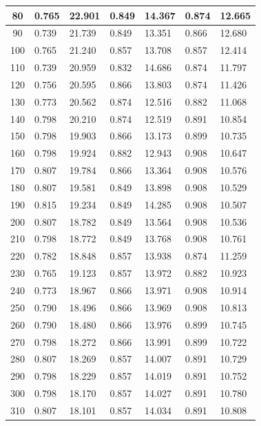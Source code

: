\begin{longtable}{|c|l|l|l|l|l|l|}
        80 & 0.765 & 22.901 & 0.849 & 14.367 & 0.874 & 12.665 \\ \hline
        90 & 0.739 & 21.739 & 0.849 & 13.351 & 0.866 & 12.680 \\ \hline
        100 & 0.765 & 21.240 & 0.857 & 13.708 & 0.857 & 12.414 \\ \hline
        110 & 0.739 & 20.959 & 0.832 & 14.686 & 0.874 & 11.797 \\ \hline
        120 & 0.756 & 20.595 & 0.866 & 13.803 & 0.874 & 11.426 \\ \hline
        130 & 0.773 & 20.562 & 0.874 & 12.516 & 0.882 & 11.068 \\ \hline
        140 & 0.798 & 20.210 & 0.874 & 12.519 & 0.891 & 10.854 \\ \hline
        150 & 0.798 & 19.903 & 0.866 & 13.173 & 0.899 & 10.735 \\ \hline
        160 & 0.798 & 19.924 & 0.882 & 12.943 & 0.908 & 10.647 \\ \hline
        170 & 0.807 & 19.784 & 0.866 & 13.364 & 0.908 & 10.576 \\ \hline
        180 & 0.807 & 19.581 & 0.849 & 13.898 & 0.908 & 10.529 \\ \hline
        190 & 0.815 & 19.234 & 0.849 & 14.285 & 0.908 & 10.507 \\ \hline
        200 & 0.807 & 18.782 & 0.849 & 13.564 & 0.908 & 10.536 \\ \hline
        210 & 0.798 & 18.772 & 0.849 & 13.768 & 0.908 & 10.761 \\ \hline
        220 & 0.782 & 18.848 & 0.857 & 13.938 & 0.874 & 11.259 \\ \hline
        230 & 0.765 & 19.123 & 0.857 & 13.972 & 0.882 & 10.923 \\ \hline
        240 & 0.773 & 18.967 & 0.866 & 13.971 & 0.908 & 10.914 \\ \hline
        250 & 0.790 & 18.496 & 0.866 & 13.969 & 0.908 & 10.813 \\ \hline
        260 & 0.790 & 18.480 & 0.866 & 13.976 & 0.899 & 10.745 \\ \hline
        270 & 0.798 & 18.272 & 0.866 & 13.991 & 0.899 & 10.722 \\ \hline
        280 & 0.807 & 18.269 & 0.857 & 14.007 & 0.891 & 10.729 \\ \hline
        290 & 0.798 & 18.229 & 0.857 & 14.019 & 0.891 & 10.752 \\ \hline
        300 & 0.798 & 18.170 & 0.857 & 14.027 & 0.891 & 10.780 \\ \hline
        310 & 0.807 & 18.101 & 0.857 & 14.034 & 0.891 & 10.808 \\ \hline

\end{longtable}
